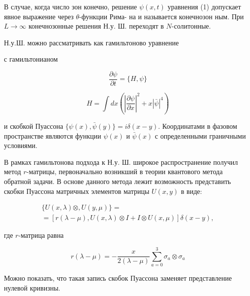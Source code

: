 \documentclass[10pt]{article}
\begin{document}
В случае, когда число зон конечно, решение $\psi(x, t)$ уравнения (1) допускает явное выражение через $\theta$-функции Рима- на и называется конечнозон ным. При $L \rightarrow \infty$ конечнозонные решения Н.у. Ш. переходят в $N$-солитонные.



Н.у.Ш. можно рассматривать как гамильтоново уравнение



с гамильтонианом



\[

\frac{\partial \psi}{\partial t}=\{H, \psi\}

\]



\[

H=\int d x\left(\left|\frac{\partial \psi}{\partial x}\right|^{2}+x|\bar{\psi}|^{4}\right)

\]



и скобкой Пуассона $\{\psi(x), \bar{\psi}(y)\}=i \delta(x-y)$. Координатами в фазовом пространстве являются функции $\psi(x)$ и $\bar{\psi}(x)$ с определенными граничными условиями.



В рамках гамильтонова подхода к Н.у. Ш. широкое распространение получил метод $r$-матрицы, первоначально возникший в теории квантового метода обратной задачи. В основе данного метода лежит возможность представить скобки Пуассона матричных элементов матрицы $U(x, y)$ в виде:



\[

\begin{gathered}

\{U(x, \lambda) \otimes, U(y, \mu)\}= \\

=[r(\lambda-\mu), U(x, \lambda) \otimes I+I \otimes U(x, \mu)] \delta(x-y),

\end{gathered}

\]



где $r$-матрица равна



\[

r(\lambda-\mu)=-\frac{x}{2(\lambda-\mu)} \sum_{a=0}^{3} \sigma_{a} \otimes \sigma_{a}

\]



Можно показать, что такая запись скобок Пуассона заменяет представление нулевой кривизны.
\end{document}

